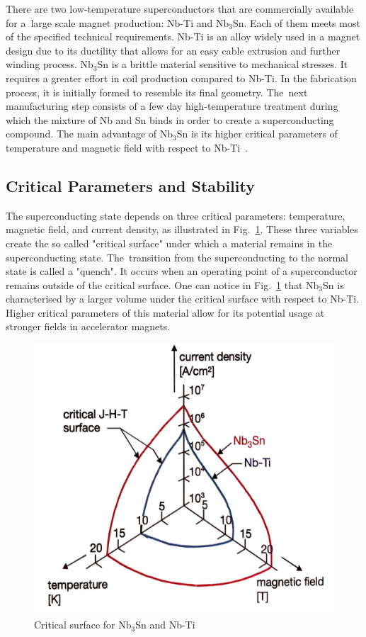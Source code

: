There are two low-temperature superconductors that are commercially available for a~large scale magnet production: Nb-Ti and $\text{Nb}_3 \text{Sn}$. Each of them meets most of the specified technical requirements. Nb-Ti is an alloy widely used in a magnet design due to its ductility that allows for an easy cable extrusion and further winding process. $\text{Nb}_3 \text{Sn}$ is a brittle material sensitive to mechanical stresses. It requires a greater effort in coil production compared to Nb-Ti. In the fabrication process, it is initially formed to resemble its final geometry. The~next manufacturing step consists of a few day high-temperature treatment during which the mixture of Nb and Sn binds in order to create a superconducting compound. The main advantage of $\text{Nb}_3 \text{Sn}$ is its higher critical parameters of temperature and magnetic field with respect to Nb-Ti~\cite[p.~29-41]{superconducting_accelerator_magnets}.

\subsection{Critical Parameters and Stability}

The superconducting state depends on three critical parameters: temperature, magnetic field, and current density, as illustrated in Fig.~\ref{fig:scheme_critical_surface}. These three variables create the so called "critical surface" under which a material remains in the superconducting state. The~transition from the superconducting to the normal state is called a "quench". It occurs when an operating point of a superconductor remains outside of the critical surface. One can notice in Fig.~\ref{fig:scheme_critical_surface} that $\text{Nb}_3 \text{Sn}$ is characterised by a larger volume under the critical surface with respect to Nb-Ti. Higher critical parameters of this material allow for its potential usage at stronger fields in accelerator magnets.

\begin{figure}[H]
    \centering
    \includegraphics[width=0.35\linewidth]{sections/introduction/figures/critical_surface_scheme.png}
    \caption{Critical surface for $\text{Nb}_\text{3}\text{Sn}$ and Nb-Ti \cite{evans_marvel_of_technology}}
    \label{fig:scheme_critical_surface}
\end{figure} 

